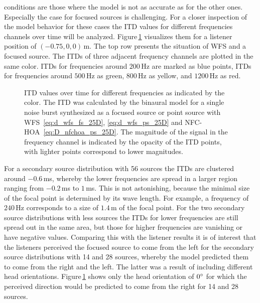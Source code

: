  conditions are those where the model is not
as accurate as for the other ones. Especially the case for focused sources is
challenging. For a closer inspection of the model behavior
for these cases the \ac{ITD} values for different frequencies
channels over time will be analyzed. Figure\,\ref{fig:itd_frequency_channels}
visualizes them for a listener position of $(-0.75,0,0)$\,m. The top row presents
the situation of \ac{WFS} and a focused source. The \acp{ITD} of three adjacent
frequency channels are plotted in the same color.
\acp{ITD} for frequencies
around $200$\,Hz are marked as blue points, \acp{ITD} for frequencies around
$500$\,Hz as green, $800$\,Hz as yellow, and $1200$\,Hz as red.
%
\begin{figure}
    \small
    \centering
    
    \caption{\ac{ITD} values over time for different frequencies as indicated by the
    color. The \ac{ITD} was calculated by the binaural model for a single noise
    burst synthesized as a focused source or point source with
    \ac{WFS}~\protect\eqref{eq:d_wfs_fs_25D}, \protect\eqref{eq:d_wfs_ps_25D} and
    \ac{NFC-HOA}~\protect\eqref{eq:D_nfchoa_ps_25D}.
    The magnitude of the signal in the frequency channel is indicated by the
    opacity of the \ac{ITD} points, with lighter points correspond to
    lower magnitudes.
    }
    \label{fig:itd_frequency_channels}
\end{figure}
%
For a secondary source distribution with 56 sources the \acp{ITD} are clustered
around $-0.6$\,ms, whereby the lower frequencies are spread in a larger region
ranging from $-0.2$\,ms to $1$\,ms. This is not astonishing, because the
minimal size of the focal point is determined by its wave length. For example,
a frequency of $240$\,Hz corresponds to a size of $1.4$\,m of the focal
point. For the two secondary source distributions with less sources the
\acp{ITD} for lower frequencies are still spread out in the same area, but those
for higher frequencies are vanishing or have negative values.
Comparing this with the listener results it is of interest that the listeners
perceived the focused source to come from the left for the secondary source
distributions with 14 and 28 sources, whereby the model predicted them to come
from the right and the left. The latter was a result of including different
head orientations. Figure\,\ref{fig:itd_frequency_channels} shows only the head
orientation of $0^\circ$ for which the perceived direction would be predicted
to come from the right for 14 and 28 sources.

